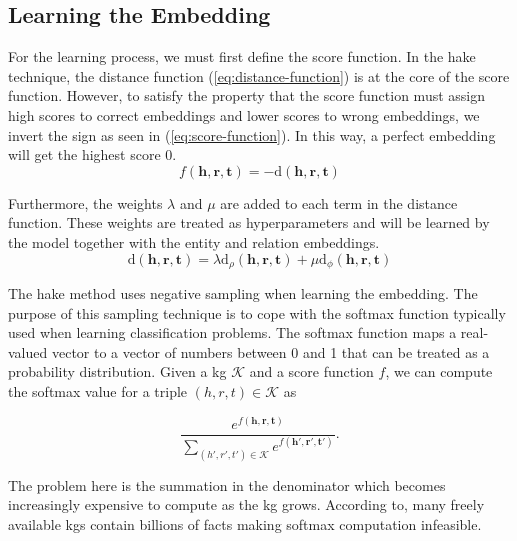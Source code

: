 \subsection{Learning the Embedding}\label{sec:learning}

For the learning process, we must first define the score function.
In the \ac{hake} technique, the distance function (\ref{eq:distance-function}) is at the core of the score function.
However, to satisfy the property that the score function must assign high scores to correct embeddings and lower scores to wrong embeddings, we invert the sign as seen in (\ref{eq:score-function}).
In this way, a perfect embedding will get the highest score $0$.
\begin{equation}\label{eq:score-function}
  f(\bm{h}, \bm{r}, \bm{t}) = - \text{d}(\bm{h}, \bm{r}, \bm{t})
\end{equation}

Furthermore, the weights $\lambda$ and $\mu$ are added to each term in the distance function.
These weights are treated as hyperparameters and will be learned by the model together with the entity and relation embeddings.
\begin{equation}
  \text{d}(\bm{h}, \bm{r}, \bm{t}) = \lambda\text{d}_\rho(\bm{h}, \bm{r}, \bm{t}) + \mu\text{d}_\phi(\bm{h}, \bm{r}, \bm{t})
\end{equation}

The \ac{hake} method uses negative sampling\cite{Mikolov2013} when learning the embedding.
The purpose of this sampling technique is to cope with the softmax function typically used when learning classification problems.
The softmax function maps a real-valued vector to a vector of numbers between 0 and 1 that can be treated as a probability distribution.
Given a \ac{kg} $\mathcal{K}$ and a score function $f$, we can compute the softmax value for a triple $(h, r, t) \in \mathcal{K}$ as

\[\frac{e^{f(\bm{h}, \bm{r}, \bm{t})}}{\sum_{(h', r', t') \in \mathcal{K}} e^{f({\bm{h'}, \bm{r'}, \bm{t'}})}}.\]

The problem here is the summation in the denominator which becomes increasingly expensive to compute as the \ac{kg} grows.
According to\cite{Paulheim2016}, many freely available \acp{kg} contain billions of facts making softmax computation infeasible.


